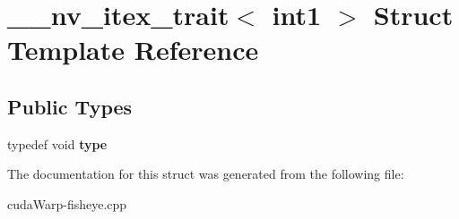 \hypertarget{struct____nv__itex__trait_3_01int1_01_4}{}\section{\+\_\+\+\_\+nv\+\_\+itex\+\_\+trait$<$ int1 $>$ Struct Template Reference}
\label{struct____nv__itex__trait_3_01int1_01_4}
\subsection*{Public Types}
\begin{DoxyCompactItemize}
\item 
typedef void {\bfseries type}\hypertarget{struct____nv__itex__trait_3_01int1_01_4_a21f2f3125bc3b1245056f13fd6ad444e}{}\label{struct____nv__itex__trait_3_01int1_01_4_a21f2f3125bc3b1245056f13fd6ad444e}

\end{DoxyCompactItemize}


The documentation for this struct was generated from the following file\+:\begin{DoxyCompactItemize}
\item 
cuda\+Warp-\/fisheye.\+cpp\end{DoxyCompactItemize}
